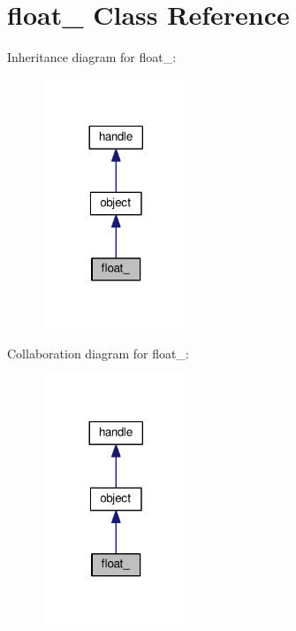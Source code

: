 \hypertarget{classfloat__}{}\section{float\+\_\+ Class Reference}
\label{classfloat__}


Inheritance diagram for float\+\_\+\+:
\nopagebreak
\begin{figure}[H]
\begin{center}
\leavevmode
\includegraphics[width=125pt]{classfloat____inherit__graph}
\end{center}
\end{figure}


Collaboration diagram for float\+\_\+\+:
\nopagebreak
\begin{figure}[H]
\begin{center}
\leavevmode
\includegraphics[width=125pt]{classfloat____coll__graph}
\end{center}
\end{figure}
